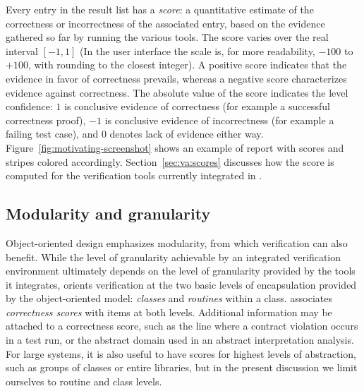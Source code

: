 Every entry in the result list has a \emph{score}: a quantitative estimate of the correctness or incorrectness of the associated entry, based on the evidence gathered so far by running the various tools.
The score varies over the real interval $[-1,1]$ (In the user interface the scale is, for more readability, $-100$ to $+100$, with rounding to the closest integer). 
A positive score indicates that the evidence in favor of correctness prevails, whereas a negative score characterizes evidence against correctness. The absolute value of the score indicates the level confidence: $1$ is conclusive evidence of correctness (for example a successful correctness proof), $-1$ is conclusive evidence of incorrectness (for example a failing test case), and $0$ denotes lack of evidence either way. Figure~\ref{fig:motivating-screenshot} shows an example of report with scores and stripes colored accordingly. Section~\ref{sec:va:scores} discusses how the score is computed for the verification tools currently integrated in \EVE.


\subsection{Modularity and granularity}

Object-oriented design emphasizes modularity, from which verification can also benefit.
While the level of granularity achievable by an integrated verification environment ultimately depends on the level of granularity provided by the tools it integrates, \EVE orients verification at the two basic levels of encapsulation provided by the object-oriented model: \emph{classes} and \emph{routines} within a class.
\EVE associates \emph{correctness scores} with items at both levels. Additional information may be attached to a correctness score, such as the line where a contract violation occurs in a test run, or the abstract domain used in an abstract interpretation analysis.
For large systems, it is also useful to have scores for highest levels of abstraction, such as groups of classes or entire libraries, but in the present discussion we limit ourselves to routine and class levels.

